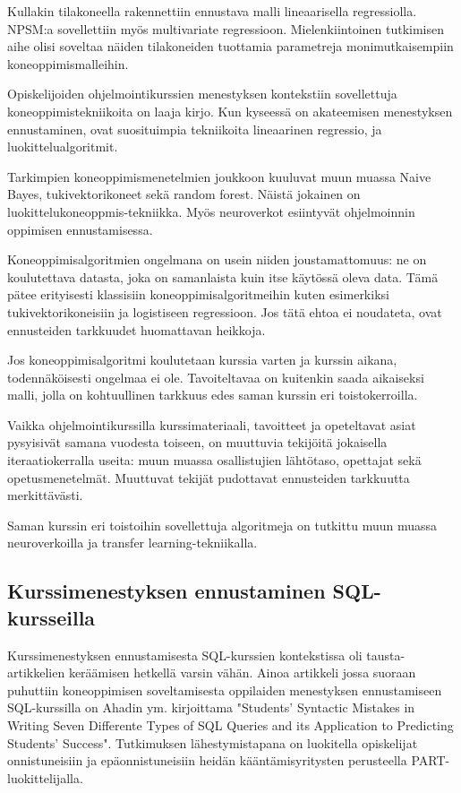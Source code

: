 \documentclass[finnish,twoside,openright]{HYgraduMLDS}
\begin{document}
Kullakin tilakoneella rakennettiin ennustava malli lineaarisella regressiolla. NPSM:a sovellettiin myös multivariate regressioon. Mielenkiintoinen tutkimisen aihe olisi soveltaa näiden tilakoneiden tuottamia parametreja monimutkaisempiin koneoppimismalleihin.

Opiskelijoiden ohjelmointikurssien menestyksen kontekstiin sovellettuja koneoppimistekniikoita on laaja kirjo. Kun kyseessä on akateemisen menestyksen ennustaminen, ovat suosituimpia tekniikoita lineaarinen regressio, ja luokittelualgoritmit\cite{hellas2018predicting}. 

Tarkimpien koneoppimismenetelmien joukkoon kuuluvat muun muassa Naive Bayes\cite{bergin2015using}, tukivektorikoneet\cite{bergin2015using} sekä random forest\cite{lagus2018transfer}. Näistä jokainen on luokittelukoneoppmis-tekniikka. Myös neuroverkot esiintyvät ohjelmoinnin oppimisen ennustamisessa\cite{Castro-Wunsch:2017:ENN:3017680.3017792}. 

Koneoppimisalgoritmien ongelmana on usein niiden joustamattomuus: ne on koulutettava datasta, joka on samanlaista kuin itse käytössä oleva data. Tämä pätee erityisesti klassisiin koneoppimisalgoritmeihin kuten esimerkiksi tukivektorikoneisiin ja logistiseen regressioon. Jos tätä ehtoa ei noudateta, ovat ennusteiden tarkkuudet huomattavan heikkoja. 

Jos koneoppimisalgoritmi koulutetaan kurssia varten ja kurssin aikana, todennäköisesti ongelmaa ei ole. Tavoiteltavaa on kuitenkin saada aikaiseksi malli, jolla on kohtuullinen tarkkuus edes saman kurssin eri toistokerroilla. 

Vaikka ohjelmointikurssilla kurssimateriaali, tavoitteet ja opeteltavat asiat pysyisivät samana vuodesta toiseen, on muuttuvia tekijöitä jokaisella iteraatiokerralla useita: muun muassa osallistujien lähtötaso, opettajat sekä opetusmenetelmät. Muuttuvat tekijät pudottavat ennusteiden tarkkuutta merkittävästi. 

Saman kurssin eri toistoihin sovellettuja algoritmeja on tutkittu muun muassa neuroverkoilla\cite{Castro-Wunsch:2017:ENN:3017680.3017792} ja transfer learning\cite{lagus2018transfer}-tekniikalla.


\subsection{Kurssimenestyksen ennustaminen SQL-kursseilla}

Kurssimenestyksen ennustamisesta SQL-kurssien kontekstissa oli tausta-artikkelien keräämisen hetkellä varsin vähän. Ainoa artikkeli jossa suoraan puhuttiin koneoppimisen soveltamisesta oppilaiden menestyksen ennustamiseen SQL-kurssilla on Ahadin ym. kirjoittama "Students' Syntactic Mistakes in Writing Seven Differente Types of SQL Queries and its Application to Predicting Students' Success"\cite{Ahadi:2016:SSM:2839509.2844640}. Tutkimuksen lähestymistapana on luokitella opiskelijat onnistuneisiin ja epäonnistuneisiin heidän kääntämisyritysten perusteella PART-luokittelijalla.
\end{document}
